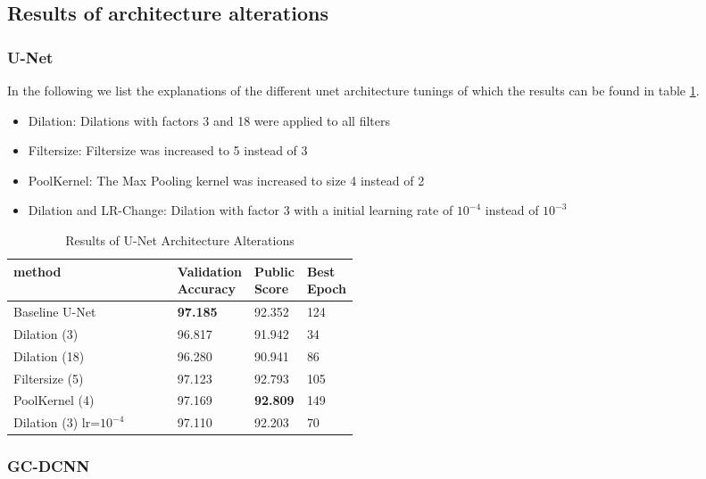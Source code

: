 \subsection{Results of architecture alterations}

\subsubsection{U-Net}

In the following we list the explanations of the different \acrshort{unet} architecture tunings of which the results can be found in table \ref{tab:unet_alt}.
\begin{itemize}
    \item Dilation: Dilations with factors 3 and 18 were applied to all filters
    \item Filtersize: Filtersize was increased to 5 instead of 3
    \item PoolKernel: The Max Pooling kernel was increased to size 4 instead of 2
    \item Dilation and LR-Change: Dilation with factor 3 with a initial learning rate of $10^{-4}$ instead of $10^{-3}$
\end{itemize}

\begin{table}[h!]
    \centering
    \begin{tabular}{l|p{0.15\linewidth}|p{0.15\linewidth}|p{0.15\linewidth}}
         method & Validation Accuracy  & Public Score & Best Epoch  \\
         \hline
         Baseline U-Net & \textbf{97.185} & 92.352 & 124\\
         Dilation (3) & 96.817 & 91.942 & 34\\
         Dilation (18) & 96.280 & 90.941 & 86\\
         Filtersize (5) & 97.123 & 92.793 & 105\\
         PoolKernel (4) & 97.169 & \textbf{92.809} & 149\\
         Dilation (3) lr=$10^{-4}$ & 97.110 & 92.203 & 70\\
    \end{tabular}
    \caption{Results of U-Net Architecture Alterations}
    \label{tab:unet_alt}
\end{table}

\subsubsection{GC-DCNN}

